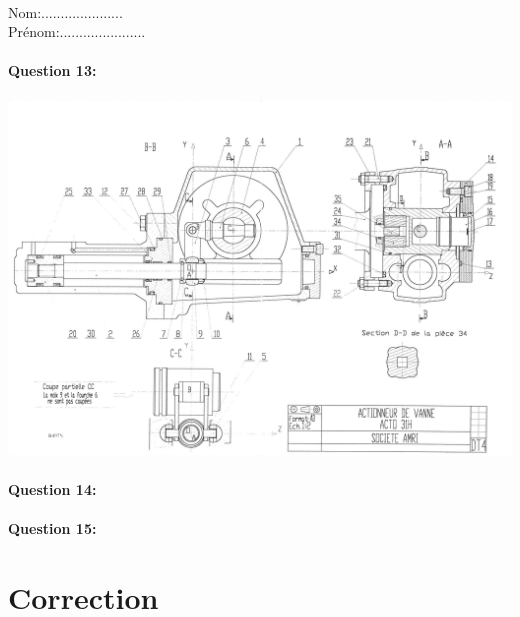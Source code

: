 \newpage

~\

\newpage
\cleardoublepage

Nom:.....................\\
Prénom:......................

\paragraph{Question 13:}

\begin{center}
 \includegraphics[width=1.3\linewidth,angle=-90]{img/Actionneur_vanne}
\end{center}


\paragraph{Question 14:}

\reponse[7]

\paragraph{Question 15:}

\reponse[7]

\ifdef{\public}{}{}

\newpage
\cleardoublepage

\pagestyle{correction}\setcounter{section}{0}

\section{Correction}

